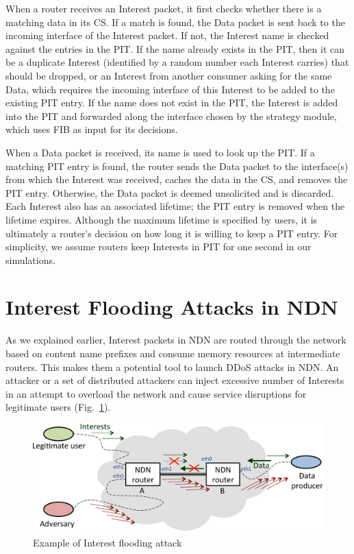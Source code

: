 \documentclass[10pt,conference]{IEEEtran}
\begin{document}
When a router receives an Interest packet, it first checks whether there is a matching data in its CS.
If a match is found, the Data packet is sent back to the incoming interface of the Interest packet.
If not, the Interest name is checked against the entries in the PIT. 
If the name already exists in the PIT, then it can be a duplicate Interest (identified by a random number each Interest carries) that should be dropped,
or an Interest from another consumer asking for the same Data, which requires the incoming interface of this Interest to be added to the existing PIT entry.
If the name does not exist in the PIT, the Interest is added into the PIT and forwarded along the interface chosen by the strategy module, which uses FIB as input for its decisions.

When a Data packet is received, its name is used to look up the PIT.
If a matching PIT entry is found,
the router sends the Data packet to the interface(s) from which the Interest was received, caches the data in the CS, and removes the PIT entry.  Otherwise, the Data packet is deemed unsolicited and is discarded. 
Each Interest also has an associated lifetime; the PIT entry is removed when the lifetime expires.
Although the maximum lifetime is specified by users, it is ultimately a router's decision on how long it is willing to keep a PIT entry.  
For simplicity, we assume routers keep Interests in PIT for one second in our simulations.

\section{Interest Flooding Attacks in NDN}
\label{sec:interest-flooding}



As we explained earlier, Interest packets in NDN are routed through the network based on content name prefixes and consume memory resources at intermediate routers. This makes them a potential tool to launch DDoS attacks in NDN. An attacker or a set of distributed attackers can inject excessive number of Interests in an attempt to overload the network and cause service disruptions for legitimate users (Fig.~\ref{fig:flooding example}). 

\begin{figure}[t]
  \centering
  \includegraphics[scale=0.3]{attack-definition}
  \caption{Example of Interest flooding attack}
  \label{fig:flooding example}
  \vspace{-0.3cm}
\end{figure}
\end{document}
